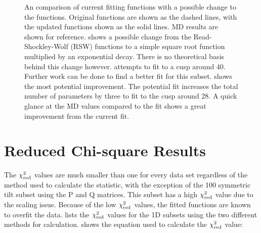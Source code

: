 \documentclass[12pt]{report}
\begin{document}
\begin{figure}[ht!]
 
 \caption{\label{fig:updatedGraphs} An comparison of current fitting functions with a possible change to the functions.  Original functions are shown as the dashed lines, with the updated functions shown as the solid lines.  MD results are shown for reference. \protect{} shows a possible change from the Read-Shockley-Wolf (RSW) functions to a simple square root function multiplied by an exponential decay.  There is no theoretical basis behind this change however. \protect{} attempts to fit to a cusp around 40\textdegree{}.  Further work can be done to find a better fit for this subset. \protect{} shows the most potential improvement.  The potential fit increases the total number of parameters by three to fit to the cusp around 28\textdegree.  A quick glance at the MD values compared to the fit shows a great improvement from the current fit.}
 
\end{figure}

\section{Reduced Chi-square Results\label{results:chi2red}}
The $\chi_{\textnormal{red}}^2$ values are much smaller than one for every data set regardless of the method used to calculate the statistic, with the exception of the \textlangle{}100\textrangle{} symmetric tilt subset using the P and Q matrices.  This subset has a high $\chi_{\textnormal{red}}^2$ value due to the scaling issue.  Because of the low $\chi_{\textnormal{red}}^2$ values, the fitted functions are known to overfit the data.\cite{bevington2003}   lists the $\chi_{\textnormal{red}}^2$ values for the 1D subsets using the two different methods for calculation.  shows the equation used to calculate the $\chi^2_{\textnormal{red}}$ value:
\end{document}
